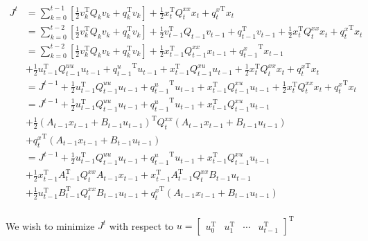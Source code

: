 \documentclass{article}
\begin{document}
\begin{align*}
    J^t &= \sum_{k=0}^{t-1} \left[ \frac{1}{2} v_k^\mathrm{T} Q_k v_k + q_k^\mathrm{T} v_k \right] + \frac{1}{2} x_t^\mathrm{T} Q_t^{xx} x_t + {q_t^x}^\mathrm{T} x_t \\
    &= \sum_{k=0}^{t-2} \left[ \frac{1}{2} v_k^\mathrm{T} Q_k v_k + q_k^\mathrm{T} v_k \right] + \frac{1}{2} v_{t-1}^\mathrm{T} Q_{t-1} v_{t-1} + q_{t-1}^\mathrm{T} v_{t-1} + \frac{1}{2} x_t^\mathrm{T} Q_t^{xx} x_t + {q_t^x}^\mathrm{T} x_t \\
    &= \sum_{k=0}^{t-2} \left[ \frac{1}{2} v_k^\mathrm{T} Q_k v_k + q_k^\mathrm{T} v_k \right] + \frac{1}{2} x_{t-1}^\mathrm{T} Q_{t-1}^{xx} x_{t-1} + {q_{t-1}^x}^\mathrm{T} x_{t-1} \\
    &+ \frac{1}{2} u_{t-1}^\mathrm{T} Q_{t-1}^{uu} u_{t-1} + {q_{t-1}^u}^\mathrm{T} u_{t-1}  + x_{t-1}^\mathrm{T} Q_{t-1}^{xu} u_{t-1} + \frac{1}{2} x_t^\mathrm{T} Q_t^{xx} x_t + {q_t^x}^\mathrm{T} x_t \\
    &= J^{t-1} + \frac{1}{2} u_{t-1}^\mathrm{T} Q_{t-1}^{uu} u_{t-1} + {q_{t-1}^u}^\mathrm{T} u_{t-1}  + x_{t-1}^\mathrm{T} Q_{t-1}^{xu} u_{t-1} + \frac{1}{2} x_t^\mathrm{T} Q_t^{xx} x_t + {q_t^x}^\mathrm{T} x_t \\
    &= J^{t-1} + \frac{1}{2} u_{t-1}^\mathrm{T} Q_{t-1}^{uu} u_{t-1} + {q_{t-1}^u}^\mathrm{T} u_{t-1}  + x_{t-1}^\mathrm{T} Q_{t-1}^{xu} u_{t-1} \\
    &+ \frac{1}{2} \left( A_{t-1} x_{t-1} + B_{t-1} u_{t-1} \right)^\mathrm{T} Q_t^{xx} \left( A_{t-1} x_{t-1} + B_{t-1} u_{t-1} \right)\\
    &+ {q_t^x}^\mathrm{T} \left( A_{t-1} x_{t-1} + B_{t-1} u_{t-1} \right) \\
    &= J^{t-1} + \frac{1}{2} u_{t-1}^\mathrm{T} Q_{t-1}^{uu} u_{t-1} + {q_{t-1}^u}^\mathrm{T} u_{t-1}  + x_{t-1}^\mathrm{T} Q_{t-1}^{xu} u_{t-1} \\
    &+ \frac{1}{2} x_{t-1}^\mathrm{T} A_{t-1}^\mathrm{T} Q_t^{xx} A_{t-1} x_{t-1} + x_{t-1}^\mathrm{T} A_{t-1}^\mathrm{T} Q_t^{xx} B_{t-1} u_{t-1}\\
    &+ \frac{1}{2} u_{t-1}^\mathrm{T} B_{t-1}^\mathrm{T} Q_t^{xx} B_{t-1} u_{t-1} + {q_t^x}^\mathrm{T} \left( A_{t-1} x_{t-1} + B_{t-1} u_{t-1} \right) \\
\end{align*}

We wish to minimize $J^t$ with respect to $u = \begin{bmatrix}
    u_0^\mathrm{T} &
    u_1^\mathrm{T} &
    \cdots &
    u_{t-1}^\mathrm{T}
\end{bmatrix}^\mathrm{T} $
\end{document}
